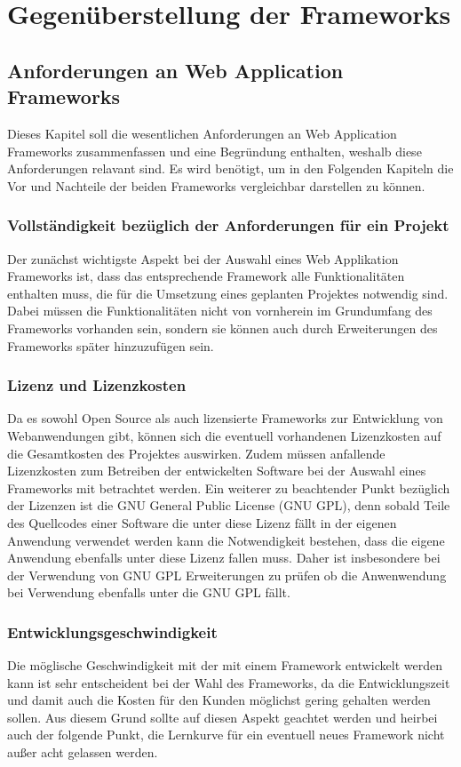 \section{Gegenüberstellung der Frameworks}
\subsection{Anforderungen an Web Application Frameworks}
Dieses Kapitel soll die wesentlichen Anforderungen an Web Application Frameworks zusammenfassen und eine Begründung enthalten, weshalb diese Anforderungen relavant sind. Es wird benötigt, um in den Folgenden Kapiteln die Vor und Nachteile der beiden Frameworks vergleichbar darstellen zu können.
\subsubsection*{Vollständigkeit bezüglich der Anforderungen für ein Projekt}
Der zunächst wichtigste Aspekt bei der Auswahl eines Web Applikation Frameworks ist, dass das entsprechende Framework alle Funktionalitäten enthalten muss, die für die Umsetzung eines geplanten Projektes notwendig sind. Dabei müssen die Funktionalitäten nicht von vornherein im Grundumfang des Frameworks vorhanden sein, sondern sie können auch durch Erweiterungen des Frameworks später hinzuzufügen sein.
\subsubsection*{Lizenz und Lizenzkosten}
Da es sowohl Open Source als auch lizensierte Frameworks zur Entwicklung von Webanwendungen gibt, können sich die eventuell vorhandenen Lizenzkosten auf die Gesamtkosten des Projektes auswirken. Zudem müssen anfallende Lizenzkosten zum Betreiben der entwickelten Software bei der Auswahl eines Frameworks mit betrachtet werden.
Ein weiterer zu beachtender Punkt bezüglich der Lizenzen ist die GNU General Public License (GNU GPL), denn sobald Teile des Quellcodes einer Software die unter diese Lizenz fällt in der eigenen Anwendung verwendet werden kann die Notwendigkeit bestehen, dass die eigene Anwendung ebenfalls unter diese Lizenz fallen muss. Daher ist insbesondere bei der Verwendung von GNU GPL Erweiterungen zu prüfen ob die Anwenwendung bei Verwendung ebenfalls unter die GNU GPL fällt.
\subsubsection*{Entwicklungsgeschwindigkeit}
Die möglische Geschwindigkeit mit der mit einem Framework entwickelt werden kann ist sehr entscheident bei der Wahl des Frameworks, da die Entwicklungszeit und damit auch die Kosten für den Kunden möglichst gering gehalten werden sollen. Aus diesem Grund sollte auf diesen Aspekt geachtet werden und heirbei auch der folgende Punkt, die Lernkurve für ein eventuell neues Framework nicht außer acht gelassen werden.
